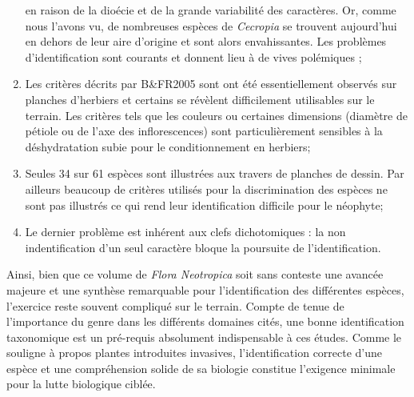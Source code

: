 \documentclass[a4paper]{article}
\theoremstyle{definition}
\theoremstyle{definition}
\theoremstyle{definition}
\theoremstyle{remark}
\begin{document}
\begin{enumerate}
  en raison de la dioécie et de la grande variabilité des caractères.
  Or, comme nous l'avons vu, de nombreuses espèces de \emph{Cecropia} se
  trouvent aujourd'hui en dehors de leur aire d'origine et sont alors
  envahissantes. Les problèmes d'identification sont courants et donnent
  lieu à de vives polémiques \citep{Sheil2011a, Sheil2011b, Webber2011};
\item
  Les critères décrits par B\&FR2005 sont ont été essentiellement
  observés sur planches d'herbiers et certains se révèlent difficilement
  utilisables sur le terrain. Les critères tels que les couleurs ou
  certaines dimensions (diamètre de pétiole ou de l'axe des
  inflorescences) sont particulièrement sensibles à la déshydratation
  subie pour le conditionnement en herbiers;
\item
  Seules 34 sur 61 espèces sont illustrées aux travers de planches de
  dessin. Par ailleurs beaucoup de critères utilisés pour la
  discrimination des espèces ne sont pas illustrés ce qui rend leur
  identification difficile pour le néophyte;
\item
  Le dernier problème est inhérent aux clefs dichotomiques : la non
  indentification d'un seul caractère bloque la poursuite de
  l'identification.
\end{enumerate}

Ainsi, bien que ce volume de \emph{Flora Neotropica} soit sans conteste
une avancée majeure et une synthèse remarquable pour l'identification
des différentes espèces, l'exercice reste souvent compliqué sur le
terrain. Compte de tenue de l'importance du genre dans les différents
domaines cités, une bonne identification taxonomique est un pré-requis
absolument indispensable à ces études. Comme le souligne
\citep{Evans2007} à propos plantes introduites invasives,
l'identification correcte d'une espèce et une compréhension solide de sa
biologie constitue l'exigence minimale pour la lutte biologique ciblée.
\end{document}
